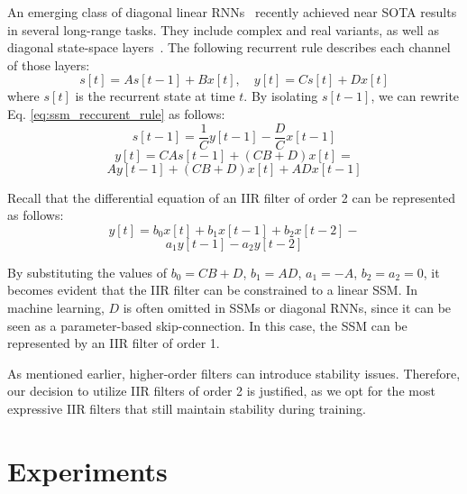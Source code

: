 \documentclass[11pt]{article}
\begin{document}
An emerging class of diagonal linear RNNs~\cite{orvieto2023resurrecting,gupta2022simplifying} recently achieved near SOTA results in several long-range tasks. They include complex and real variants, as well as diagonal state-space layers~\cite{gupta2022diagonal,gu2022parameterization}. The following recurrent rule describes each channel of those layers:
\begin{equation}
\label{eq:ssm_reccurent_rule}
    s[t] = A s[t-1] + B x[t],\quad y[t] = C s[t] + D x[t]
\end{equation}
where $s[t]$ is the recurrent state at time $t$. By isolating $s[t-1]$, we can rewrite Eq. \ref{eq:ssm_reccurent_rule} as follows:
\begin{equation}
\label{eq:ssm_reccurent_rule_2}
    s[t-1] = \frac{1}{C} y[t-1] - \frac{D}{C} x[t-1]
\end{equation}
\begin{equation}
\label{eq:ssm_reccurent_rule_3}
    y[t] = CA s[t-1] + (CB+D) x[t] =
\end{equation}
\begin{equation}
\label{eq:ssm_reccurent_rule_4}
\nonumber
     A y[t-1] + (CB+D) x[t] + AD x[t-1] 
\end{equation}

Recall that the differential equation of an IIR filter of order 2 can be represented as follows:
\begin{equation}
\label{eq:iir_order2_diff_eq}
y[t] = b_0 x[t] + b_1 x[t-1] + b_2  x[t-2] - 
\end{equation}
\begin{equation}
\nonumber
 a_1  y[t-1] - a_2  y[t-2]
\end{equation}

By substituting the values of $b_0 = CB+D$, $b_1 = AD$, $a_1 = -A$, $b_2 = a_2 = 0$, it becomes evident that the IIR filter can be constrained to a linear SSM. In machine learning, $D$ is often omitted in SSMs or diagonal RNNs, since it can be seen as a parameter-based skip-connection. In this case, the SSM can be represented by an IIR filter of order 1.

As mentioned earlier, higher-order filters can introduce stability issues. Therefore, our decision to utilize IIR filters of order 2 is justified, as we opt for the most expressive IIR filters that still maintain stability during training.

\section{Experiments} 
\end{document}
